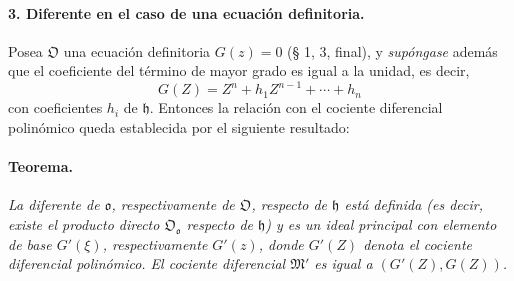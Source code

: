 \paragraph{3. Diferente en el caso de una ecuación definitoria.}
Posea $\mathfrak O$ una ecuación definitoria $G(z)=0$ (§ 1, 3, final), y \emph{supóngase} además que el coeficiente del término de mayor grado es igual a la unidad, es decir,
\[
G(Z)=Z^n+h_1Z^{n-1}+\cdots+h_n
\]
con coeficientes $h_i$ de $\mathfrak h$. Entonces la relación con el cociente diferencial polinómico queda establecida por el siguiente resultado:

\paragraph{Teorema.}
\emph{La diferente de $\mathfrak o$, respectivamente de $\mathfrak O$, respecto de $\mathfrak h$ está definida (es decir, existe el producto directo $\mathfrak O_{\mathfrak o}$ respecto de $\mathfrak h$) y es un ideal principal con elemento de base $G'(\xi)$, respectivamente $G'(z)$, donde $G'(Z)$ denota el cociente diferencial polinómico. El cociente diferencial $\mathfrak M'$ es igual a $(G'(Z),G(Z))$.}

